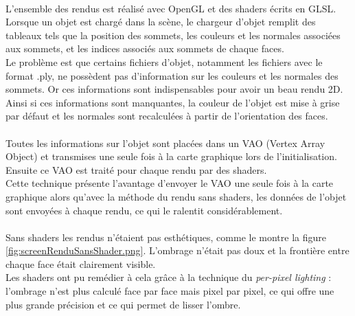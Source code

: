 \paragraph{}
L'ensemble des rendus est réalisé avec OpenGL et des shaders écrits en GLSL. Lorsque un objet est chargé dans la scène, le chargeur d'objet remplit des tableaux tels que la position des sommets, les couleurs et les normales associées aux sommets, et les indices associés aux sommets de chaque faces.\\
Le problème est que certains fichiers d'objet, notamment les fichiers avec le format .ply, ne possèdent pas d'information sur les couleurs et les normales des sommets. Or ces informations sont indispensables pour avoir un beau rendu 2D. Ainsi si ces informations sont manquantes, la couleur de l'objet est mise à grise par défaut et les normales sont recalculées à partir de l'orientation des faces.

\paragraph{}
Toutes les informations sur l'objet sont placées dans un VAO (Vertex Array Object) et transmises une seule fois à la carte graphique lors de l'initialisation. Ensuite ce VAO est traité pour chaque rendu par des shaders.\\
Cette technique présente l'avantage d'envoyer le VAO une seule fois à la carte graphique alors qu'avec la méthode du rendu sans shaders, les données de l'objet sont envoyées à chaque rendu, ce qui le ralentit considérablement.

\paragraph{}
Sans shaders les rendus n'étaient pas esthétiques, comme le montre la figure \ref{fig:screenRenduSansShader.png}. L'ombrage n'était pas doux et la frontière entre chaque face était clairement visible.\\
Les shaders ont pu remédier à cela grâce à la technique du \textit{per-pixel lighting} : l'ombrage n'est plus calculé face par face mais pixel par pixel, ce qui offre une plus grande précision et ce qui permet de lisser l'ombre.\\

